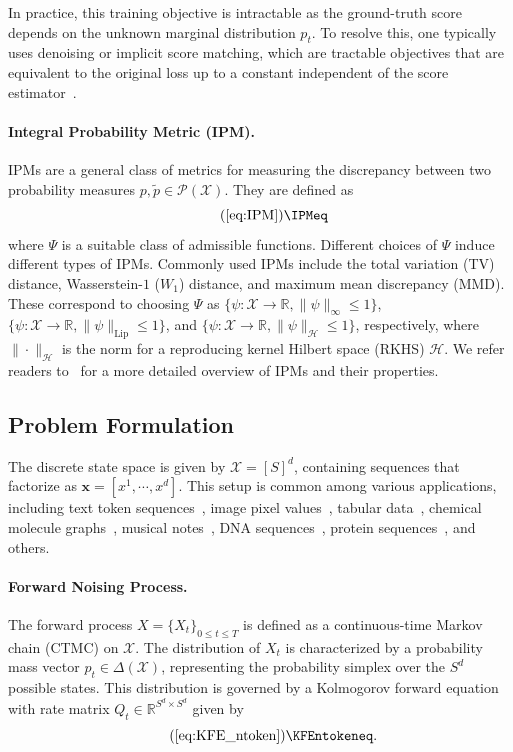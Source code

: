 \documentclass{article} %
\begin{document}
In practice, this training objective is intractable as the ground-truth score depends on the unknown marginal distribution $p_t$. To resolve this, one typically uses denoising or implicit score matching, which are tractable objectives that are equivalent to the original loss up to a constant independent of the score estimator~\cite{lou2024discrete}.

\paragraph{Integral Probability Metric (IPM).} 
IPMs are a general class of metrics for measuring the discrepancy between two probability measures $p, \tilde{p} \in \mathcal{P}(\mathcal{X})$. They are defined as
\begin{equation}\tag{\ref*{eq:IPM}}
    \IPMeq
\end{equation}
where $\Psi$ is a suitable class of admissible functions. Different choices of $\Psi$ induce different types of IPMs. Commonly used IPMs include the total variation (TV) distance, Wasserstein-$1$ ($W_1$) distance, and maximum mean discrepancy (MMD).
These correspond to choosing $\Psi$ as $ \{\psi :  \mathcal{X} \to \mathbb{R}, \| \psi \|_\infty \leq 1 \}$, $ \{\psi :  \mathcal{X} \to \mathbb{R}, \| \psi \|_{\mathrm{Lip}} \leq 1 \}$, and $ \{\psi :  \mathcal{X} \to \mathbb{R}, \| \psi \|_{\mathcal{H}} \leq 1 \}$, respectively, where $\|\cdot\|_\mathcal{H}$ is the norm for a reproducing kernel Hilbert space (RKHS) $\mathcal{H}$. We refer readers to~\cite{sriperumbudur2009integral,peyre2019computational,Birrell2022} for a more detailed overview of IPMs and their properties.

\subsection{Problem Formulation}
The discrete state space is given by $\mathcal{X}=[S]^d$, containing sequences that factorize as $\mathbf{x}=[x^1,\dotsm ,x^d]$. This setup is common among various applications, including text token sequences~\citep{lou2024discrete}, image pixel values~\citep{campbell2022continuous}, tabular data~\citep{kotelnikov2023tabddpm}, chemical molecule graphs~\citep{vignac2023digress}, musical  notes~\citep{campbell2022continuous}, DNA sequences~\citep{schiff2025simple}, protein sequences~\citep{campbell2024generative}, and others.


\paragraph{Forward Noising Process.} The forward process $X = \{ X_t\}_{0 \leq t \leq T}$ is defined as a continuous-time Markov chain (CTMC) on $\mathcal{X}$. The distribution of $X_t$ is characterized by a probability mass vector $p_t \in \Delta(\mathcal{X})$, representing the probability simplex over the $S^d$ possible states. This distribution is governed by a Kolmogorov forward equation with rate matrix $Q_t\in \mathbb{R}^{S^d \times S^d}$ given by
\begin{equation}\tag{\ref*{eq:KFE_ntoken}}
    \KFEntokeneq.
\end{equation}
\end{document}
